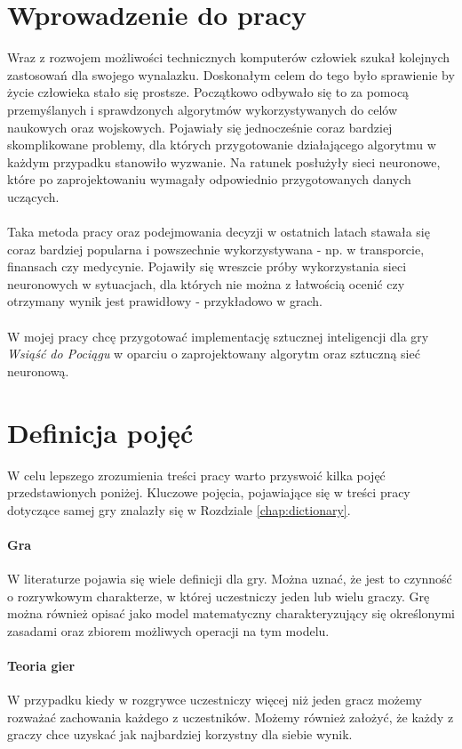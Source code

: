 \documentclass[12pt, oneside]{report}
\begin{document}
\section{Wprowadzenie do pracy}
Wraz z rozwojem możliwości technicznych komputerów człowiek szukał kolejnych zastosowań dla swojego wynalazku. Doskonałym celem do tego było sprawienie by życie człowieka stało się prostsze. Początkowo odbywało się to za pomocą przemyślanych i sprawdzonych algorytmów wykorzystywanych do celów naukowych oraz wojskowych. Pojawiały się jednocześnie coraz bardziej skomplikowane problemy, dla których przygotowanie działającego algorytmu w każdym przypadku stanowiło wyzwanie. Na ratunek posłużyły sieci neuronowe, które po zaprojektowaniu wymagały odpowiednio przygotowanych danych uczących. \\ \\
Taka metoda pracy oraz podejmowania decyzji w ostatnich latach stawała się coraz bardziej popularna i powszechnie wykorzystywana - np. w transporcie, finansach czy medycynie. Pojawiły się wreszcie próby wykorzystania sieci neuronowych w sytuacjach, dla których nie można z łatwością ocenić czy otrzymany wynik jest prawidłowy - przykładowo w grach. \\ \\ 
W mojej pracy chcę przygotować implementację sztucznej inteligencji dla gry \textit{Wsiąść do Pociągu} w oparciu o zaprojektowany algorytm oraz sztuczną sieć neuronową. 
\section{Definicja pojęć}
\label{section:Definitions}
W celu lepszego zrozumienia treści pracy warto przyswoić kilka pojęć przedstawionych poniżej. Kluczowe pojęcia, pojawiające się w treści pracy dotyczące samej gry znalazły się w Rozdziale \ref{chap:dictionary}.
\paragraph{Gra} W literaturze pojawia się wiele definicji dla gry. Można uznać, że jest to czynność o rozrywkowym charakterze, w której uczestniczy jeden lub wielu graczy. Grę można również opisać jako model matematyczny charakteryzujący się określonymi zasadami oraz zbiorem możliwych operacji na tym modelu.
\paragraph{Teoria gier} W przypadku kiedy w rozgrywce uczestniczy więcej niż jeden gracz możemy rozważać zachowania każdego z uczestników. Możemy również założyć, że każdy z graczy chce uzyskać jak najbardziej korzystny dla siebie wynik. 
\end{document}
